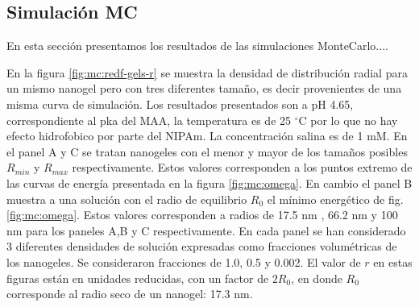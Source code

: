 






\subsection{Simulaci\'on MC}

En esta secci\'on presentamos los resultados de las simulaciones MonteCarlo....

En la figura \ref{fig:mc:redf-gels-r} se muestra la densidad de  distribuci\'on radial para un mismo nanogel pero con tres diferentes tama\~no, es decir  provenientes de una misma curva de simulaci\'on. Los resultados presentados son a pH 4.65, correspondiente al pka del MAA, la temperatura es de 25 $^\circ$C por lo que no hay efecto hidrofobico por parte del NIPAm. La concentraci\'on salina es de 1 mM.
En el panel A y C se tratan nanogeles con el menor y mayor de los tama\~nos posibles $R_{min}$ y $R_{max}$ respectivamente.  Estos valores corresponden a los puntos extremo de las curvas de energ\'ia presentada en la figura \ref{fig:mc:omega}. En cambio el panel B muestra a una soluci\'on con el radio de equilibrio $R_0$ el m\'inimo energ\'etico de fig. \ref{fig:mc:omega}.
 Estos valores corresponden a radios de 17.5 nm , 66.2 nm y 100 nm para los paneles A,B y C respectivamente. En cada panel 
 se han considerado 3 diferentes densidades de soluci\'on expresadas como fracciones volum\'etricas de los nanogeles. Se consideraron fracciones de 1.0, 0.5 y 0.002. 
 El valor de $r$ en estas figuras est\'an en unidades reducidas, con un factor de $2R_0$, en donde $R_0$ corresponde al radio seco de un nanogel: 17.3 nm. 

